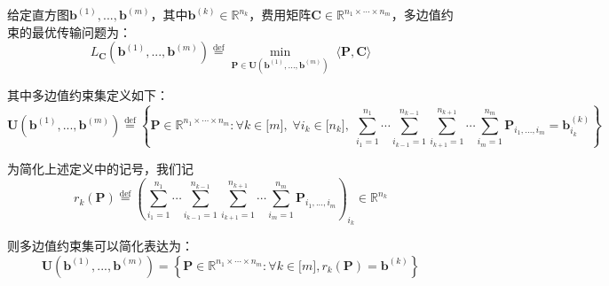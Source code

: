 \documentclass[cn,10pt,math=newtx,citestyle=gb7714-2015,bibstyle=gb7714-2015]{elegantbook}
\begin{document}
\begin{definition}[多边值约束的最优传输问题]
    给定直方图$\mathbf{b}^{(1)},...,\mathbf{b}^{(m)}$，其中$\mathbf{b}^{(k)}\in\mathbb{R}^{n_k}$，费用矩阵$\mathbf{C}\in\mathbb{R}^{n_1\times \cdots \times n_m}$，多边值约束的最优传输问题为：
    \begin{equation}
        L_\mathbf{C}(\mathbf{b}^{(1)},...,\mathbf{b}^{(m)}) \overset{\text{def}}{=} \min_{\mathbf{P}\in\mathbf{U}(\mathbf{b}^{(1)},...,\mathbf{b}^{(m)})} \; \langle \mathbf{P}, \mathbf{C} \rangle
    \end{equation}
    
    其中多边值约束集定义如下：
    \begin{equation*}
        \mathbf{U}(\mathbf{b}^{(1)},...,\mathbf{b}^{(m)}) \overset{\text{def}}{=}\left\{ \mathbf{P}\in\mathbb{R}^{n_1\times \cdots \times n_m} : \forall k\in\mathbb{[}m\mathbb{]},\;\forall i_k\in \mathbb{[}n_k\mathbb{]}, \; \sum_{i_1=1}^{n_1}\cdots \sum_{i_{k-1}=1}^{n_{k-1}}\sum_{i_{k+1}=1}^{n_{k+1}} \cdots \sum_{i_{m}=1}^{n_{m}} \mathbf{P}_{i_1,...,i_m}=\mathbf{b}^{(k)}_{i_k} \right\}
    \end{equation*}
\end{definition}

为简化上述定义中的记号，我们记
\begin{equation}
    r_k(\mathbf{P}) \overset{\text{def}}{=} \left(\sum_{i_1=1}^{n_1}\cdots \sum_{i_{k-1}=1}^{n_{k-1}}\sum_{i_{k+1}=1}^{n_{k+1}} \cdots \sum_{i_{m}=1}^{n_{m}} \mathbf{P}_{i_1,...,i_m}\right)_{i_k} \in \mathbb{R}^{n_k}
\end{equation}

则多边值约束集可以简化表达为：
\begin{equation}
    \mathbf{U}(\mathbf{b}^{(1)},...,\mathbf{b}^{(m)}) =\left\{ \mathbf{P}\in\mathbb{R}^{n_1\times \cdots \times n_m} : \forall k\in\mathbb{[}m\mathbb{]}, r_k(\mathbf{P})=\mathbf{b}^{(k)} \right\}
\end{equation}
\end{document}
